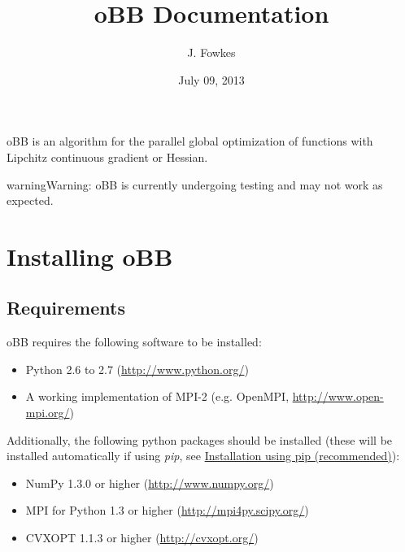 \documentclass[letterpaper,11pt,openany,oneside]{sphinxmanual}
\title{oBB Documentation}
\date{July 09, 2013}
\author{J. Fowkes}
\begin{document}
\maketitle
\tableofcontents
{}\label{index::doc}


oBB is an algorithm for the parallel global optimization of functions with Lipchitz continuous gradient or Hessian.

\begin{notice}{warning}{Warning:}
oBB is currently undergoing testing and may not work as expected.
\end{notice}


\chapter{Installing oBB}
\label{install:installing-obb}\label{install::doc}\label{install:obb-documentation}

\section{Requirements}
\label{install:requirements}
oBB requires the following software to be installed:
\begin{itemize}
\item {} 
Python 2.6 to 2.7 (\href{http://www.python.org/}{http://www.python.org/})

\item {} 
A working implementation of MPI-2 (e.g. OpenMPI, \href{http://www.open-mpi.org/}{http://www.open-mpi.org/})

\end{itemize}

Additionally, the following python packages should be installed (these will be installed automatically if using \emph{pip}, see {\hyperref[install:installation-using-pip-recommended]{Installation using pip (recommended)}}):
\begin{itemize}
\item {} 
NumPy 1.3.0 or higher (\href{http://www.numpy.org/}{http://www.numpy.org/})

\item {} 
MPI for Python 1.3 or higher (\href{http://mpi4py.scipy.org/}{http://mpi4py.scipy.org/})

\item {} 
CVXOPT 1.1.3 or higher (\href{http://cvxopt.org/}{http://cvxopt.org/})

\end{itemize}
\end{document}
